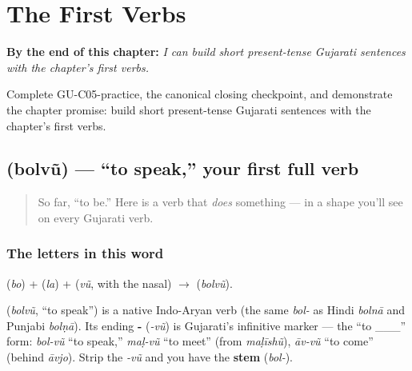 
\chapter{The First Verbs}
\label{ch:first-verbs}

\begin{chapteropening}
\textbf{By the end of this chapter:} \emph{I can build short present-tense Gujarati sentences with the chapter's first verbs.}

Complete GU-C05-practice, the canonical closing checkpoint, and demonstrate the chapter promise: build short present-tense Gujarati sentences with the chapter's first verbs.
\end{chapteropening}

\section[\gu{બોલવું}]{ (bolvũ) — \textquotedblleft{}to speak,\textquotedblright{} your first full verb}

\label{lesson:GU-C05-bolvun}



\begin{quote}
So far, \textquotedblleft{}to be.\textquotedblright{} Here is a verb that \emph{does} something — in a shape you'll see on every Gujarati verb.
\end{quote}

\subsection*{The letters in this word}
\textbf{} (\emph{bo}) + \textbf{} (\emph{la}) + \textbf{} (\emph{vũ}, with the nasal) $\to$ \textbf{} (\emph{bolvũ}).

\begin{cousinweb}
\textbf{} (\emph{bolvũ}, \textquotedblleft{}to speak\textquotedblright{}) is a native Indo-Aryan verb (the same \emph{bol-} as Hindi \emph{bolnā} and Punjabi \emph{bolṇā}). Its ending \textbf{-} (\emph{-vũ}) is Gujarati's infinitive marker — the \textquotedblleft{}to \_\_\_\textquotedblright{} form: \emph{bol-vũ} \textquotedblleft{}to speak,\textquotedblright{} \emph{maḷ-vũ} \textquotedblleft{}to meet\textquotedblright{} (from \emph{maḷīshũ}), \emph{āv-vũ} \textquotedblleft{}to come\textquotedblright{} (behind \emph{āvjo}). Strip the \emph{-vũ} and you have the \textbf{stem} (\emph{bol-}).
\end{cousinweb}

